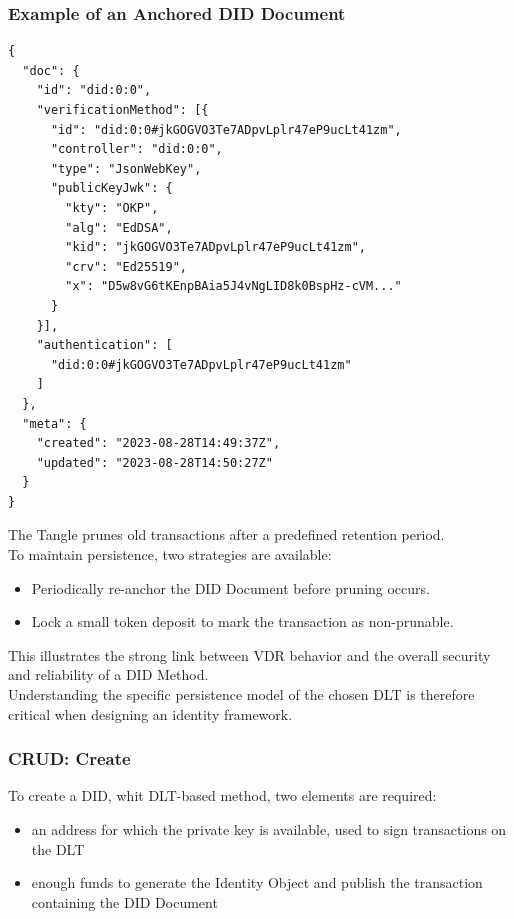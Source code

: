 \subsubsection*{Example of an Anchored DID Document}
\begin{verbatim}
{
  "doc": {
    "id": "did:0:0",
    "verificationMethod": [{
      "id": "did:0:0#jkGOGVO3Te7ADpvLplr47eP9ucLt41zm",
      "controller": "did:0:0",
      "type": "JsonWebKey",
      "publicKeyJwk": {
        "kty": "OKP",
        "alg": "EdDSA",
        "kid": "jkGOGVO3Te7ADpvLplr47eP9ucLt41zm",
        "crv": "Ed25519",
        "x": "D5w8vG6tKEnpBAia5J4vNgLID8k0BspHz-cVM..."
      }
    }],
    "authentication": [
      "did:0:0#jkGOGVO3Te7ADpvLplr47eP9ucLt41zm"
    ]
  },
  "meta": {
    "created": "2023-08-28T14:49:37Z",
    "updated": "2023-08-28T14:50:27Z"
  }
}
\end{verbatim}

\noindent
The Tangle prunes old transactions after a predefined retention period.\\ 
To maintain persistence, two strategies are available:
\begin{itemize}
    \item Periodically re-anchor the DID Document before pruning occurs.
    \item Lock a small token deposit to mark the transaction as non-prunable.
\end{itemize}

\noindent
This illustrates the strong link between VDR behavior and the overall security and reliability of a DID Method.\\  
Understanding the specific persistence model of the chosen DLT is therefore critical when designing an identity framework.

\subsubsection *{CRUD: Create}

To create a DID, whit DLT-based method, two elements are required: 
\begin{itemize}
    \item an address for which the private key is available, used to sign transactions on the DLT
    \item enough funds to generate the Identity Object and publish the transaction containing the DID Document
\end{itemize}

